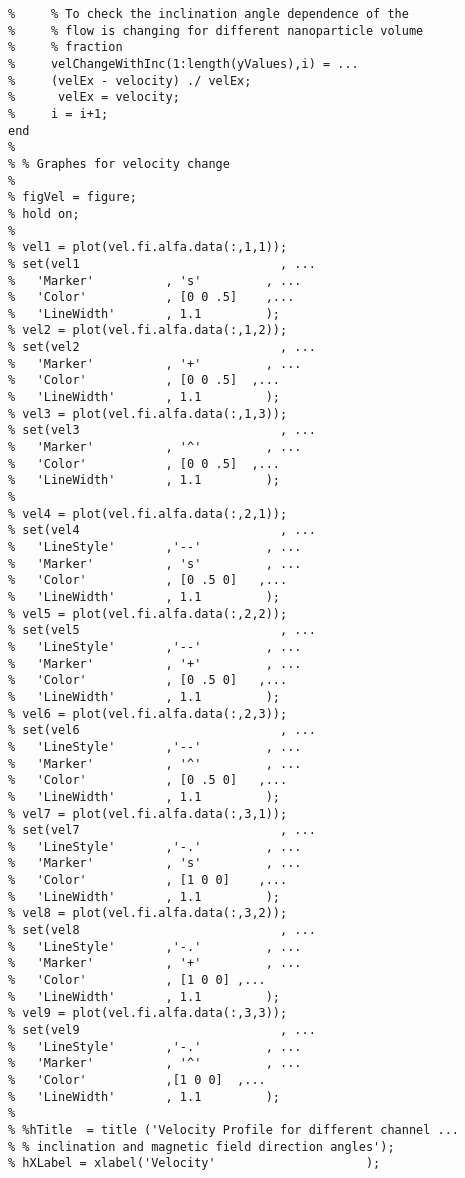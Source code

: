 \begin{lstlisting}
%     % To check the inclination angle dependence of the 
%     % flow is changing for different nanoparticle volume
%     % fraction
%     velChangeWithInc(1:length(yValues),i) = ...
%     (velEx - velocity) ./ velEx;
%      velEx = velocity;
%     i = i+1;
end
% 
% % Graphes for velocity change
% 
% figVel = figure;
% hold on;
% 
% vel1 = plot(vel.fi.alfa.data(:,1,1));
% set(vel1                            , ...
%   'Marker'          , 's'         , ...
%   'Color'           , [0 0 .5]    ,...
%   'LineWidth'       , 1.1         );
% vel2 = plot(vel.fi.alfa.data(:,1,2));
% set(vel2                            , ...
%   'Marker'          , '+'         , ...
%   'Color'           , [0 0 .5]  ,...
%   'LineWidth'       , 1.1         );
% vel3 = plot(vel.fi.alfa.data(:,1,3));
% set(vel3                            , ...
%   'Marker'          , '^'         , ...
%   'Color'           , [0 0 .5]  ,...
%   'LineWidth'       , 1.1         );
% 
% vel4 = plot(vel.fi.alfa.data(:,2,1));
% set(vel4                            , ...
%   'LineStyle'       ,'--'         , ...
%   'Marker'          , 's'         , ...
%   'Color'           , [0 .5 0]   ,...
%   'LineWidth'       , 1.1         );
% vel5 = plot(vel.fi.alfa.data(:,2,2));
% set(vel5                            , ...
%   'LineStyle'       ,'--'         , ...
%   'Marker'          , '+'         , ...
%   'Color'           , [0 .5 0]   ,...
%   'LineWidth'       , 1.1         );
% vel6 = plot(vel.fi.alfa.data(:,2,3));
% set(vel6                            , ...
%   'LineStyle'       ,'--'         , ...
%   'Marker'          , '^'         , ...
%   'Color'           , [0 .5 0]   ,...
%   'LineWidth'       , 1.1         );
% vel7 = plot(vel.fi.alfa.data(:,3,1));
% set(vel7                            , ...
%   'LineStyle'       ,'-.'         , ...
%   'Marker'          , 's'         , ...
%   'Color'           , [1 0 0]    ,...
%   'LineWidth'       , 1.1         );
% vel8 = plot(vel.fi.alfa.data(:,3,2));
% set(vel8                            , ...
%   'LineStyle'       ,'-.'         , ...
%   'Marker'          , '+'         , ...
%   'Color'           , [1 0 0] ,...
%   'LineWidth'       , 1.1         );
% vel9 = plot(vel.fi.alfa.data(:,3,3));
% set(vel9                            , ...
%   'LineStyle'       ,'-.'         , ...
%   'Marker'          , '^'         , ...
%   'Color'           ,[1 0 0]  ,...
%   'LineWidth'       , 1.1         );
% 
% %hTitle  = title ('Velocity Profile for different channel ...
% % inclination and magnetic field direction angles');
% hXLabel = xlabel('Velocity'                     );  

\end{lstlisting}
